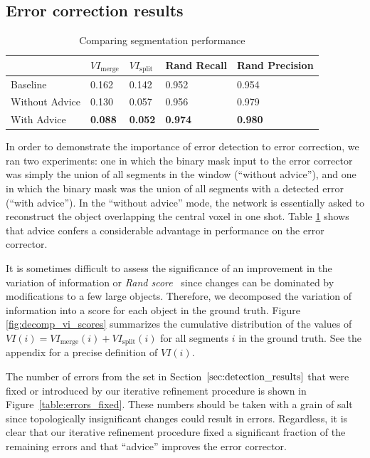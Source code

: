 \documentclass{article}
\begin{document}
\subsection{Error correction results}
\begin{table}[!b]
  \caption{Comparing segmentation performance}
  \label{table:vi_scores}
  \centering
  \begin{tabular}{lllll}
    \toprule
	& $VI_\text{merge}$ & $VI_\text{split}$ & Rand Recall & Rand Precision\\
    \midrule
    Baseline & 0.162 & 0.142 & 0.952 & 0.954\\
    Without Advice & 0.130 & 0.057 & 0.956 & 0.979\\
	With Advice & \textbf{0.088} & \textbf{0.052} & \textbf{0.974} & \textbf{0.980}\\
    \bottomrule
  \end{tabular}
\end{table}

In order to demonstrate the importance of error detection to error correction,
we ran two experiments: one in which the binary mask input to the error
corrector was simply the union of all segments in the window (``without
advice''), and one in which the binary mask was the union of all segments with a
detected error (``with advice''). In the ``without advice'' mode, the network is
essentially asked to reconstruct the object overlapping the central voxel in one
shot. Table \ref{table:vi_scores} shows that advice confers a considerable
advantage in performance on the error corrector.

It is sometimes difficult to assess the significance of an improvement in the
variation of information or \textsl{Rand score}~\cite{rand1971,ignacio2015}
since changes can be dominated by modifications to a few large objects.
Therefore, we decomposed the variation of information into a score for each
object in the ground truth. Figure \ref{fig:decomp_vi_scores} summarizes the
cumulative distribution of the values of
$VI(i)=VI_\text{merge}(i)+VI_\text{split}(i)$ for all segments $i$ in the ground
truth. See the appendix for a precise definition of $VI(i)$.

The number of errors from the set in Section~$\ref{sec:detection_results}$ that
were fixed or introduced by our iterative refinement procedure is shown in
Figure~\ref{table:errors_fixed}. These numbers should be taken with a grain of
salt since topologically insignificant changes could result in errors.
Regardless, it is clear that our iterative refinement procedure fixed a
significant fraction of the remaining errors and that ``advice'' improves the
error corrector.
\end{document}
